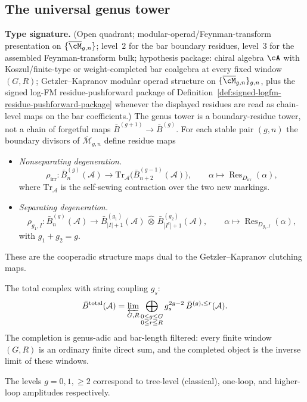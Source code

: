 
\subsection{The universal genus tower}\label{subsec:universal-tower}

\begin{theorem}\label{thm:master-tower}
\textbf{Type signature.} (Open quadrant; modular-operad/Feynman-transform
presentation on $\{\overline{\cM}_{g,n}\}$; level~$2$ for the bar
boundary residues, level~$3$ for the assembled Feynman-transform bulk;
hypothesis package: chiral algebra $\cA$ with Koszul/finite-type or
weight-completed bar coalgebra at every fixed window $(G,R)$;
Getzler--Kapranov modular operad structure on
$\{\overline{\cM}_{g,n}\}_{g,n}$, plus the signed log-FM
residue-pushforward package of
Definition~\ref{def:signed-logfm-residue-pushforward-package} whenever
the displayed residues are read as chain-level maps on the bar
coefficients.)
The genus tower is a boundary-residue tower, not a chain of
forgetful maps $\bar B^{(g+1)}\to\bar B^{(g)}$.  For each stable
pair $(g,n)$ the boundary divisors of $\overline{\mathcal{M}}_{g,n}$
define residue maps
\begin{itemize}
\item \emph{Nonseparating degeneration.}
\[
\rho_{\mathrm{irr}}\colon
\bar{B}^{(g)}_n(\mathcal{A})
\longrightarrow
\mathrm{Tr}_{\mathcal{A}}\bigl(\bar{B}^{(g-1)}_{n+2}(\mathcal{A})\bigr),
\qquad
\alpha\longmapsto \operatorname{Res}_{D_{\mathrm{irr}}}(\alpha),
\]
where $\mathrm{Tr}_{\mathcal{A}}$ is the self-sewing contraction over
the two new markings.
\item \emph{Separating degeneration.}
\[
\rho_{g_1,I}\colon
\bar{B}^{(g)}_n(\mathcal{A})
\longrightarrow
\bar{B}^{(g_1)}_{|I|+1}(\mathcal{A})
\,\widehat{\otimes}\,
\bar{B}^{(g_2)}_{|I^c|+1}(\mathcal{A}),
\qquad
\alpha\longmapsto \operatorname{Res}_{D_{g_1,I}}(\alpha),
\]
with $g_1+g_2=g$.
\end{itemize}
These are the cooperadic structure maps dual to the
Getzler--Kapranov clutching maps.

The total complex with string coupling $g_s$:
\[
\bar{B}^{\mathrm{total}}(\mathcal{A})
=
\varprojlim_{G,R}
\bigoplus_{\substack{0\leq g\leq G\\0\leq r\leq R}}
g_s^{2g-2}\,\bar{B}^{(g),\leq r}(\mathcal{A}).
\]
The completion is genus-adic and bar-length filtered: every finite
window $(G,R)$ is an ordinary finite direct sum, and the completed
object is the inverse limit of these windows.

The levels $g=0,1,\geq 2$ correspond to tree-level (classical), one-loop, and higher-loop amplitudes respectively.
\end{theorem}


